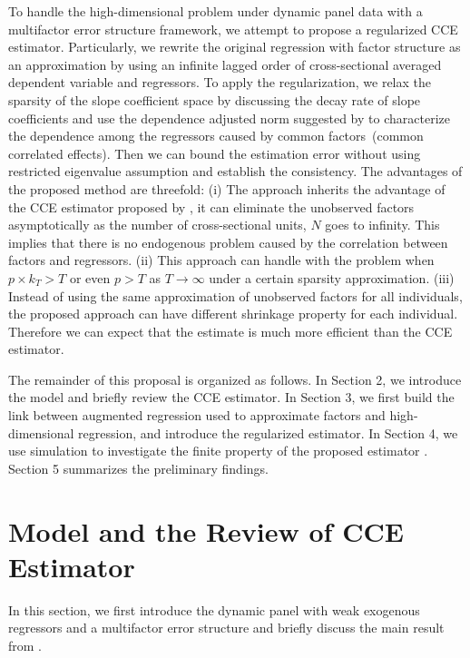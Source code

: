 \documentclass[11pt,a4paper]{article}
\theoremstyle{definition}
\begin{document}
To handle the high-dimensional problem under dynamic panel data with a multifactor error structure framework, we attempt to propose a regularized CCE estimator. Particularly, we rewrite the original regression with factor structure as an approximation by using an infinite lagged order of cross-sectional averaged dependent variable and regressors. To apply the regularization, we relax the sparsity of the slope coefficient space by discussing the decay rate of slope coefficients and use the dependence adjusted norm suggested by \citet{Han2020} to characterize the dependence among the regressors caused by common factors~(common correlated effects).  Then we can bound the estimation error without using restricted eigenvalue assumption and establish the consistency. The advantages of the proposed method are threefold: (i) The  approach inherits the advantage of the CCE estimator proposed by \citet{Chudik2015}, it can eliminate the unobserved factors asymptotically as the number of cross-sectional units, $N$ goes to infinity. This implies that there is no endogenous problem caused by the correlation between factors and regressors. (ii) This approach can handle with the problem when  $p\times k_T>T$ or even $p>T$ as $T\rightarrow\infty$ under a certain sparsity approximation. (iii) Instead of using the same approximation of unobserved factors  for all individuals, the proposed approach can have different shrinkage property for each individual. Therefore we can expect that the estimate is much more efficient than the CCE estimator.

The remainder of this proposal is organized as follows. In Section 2, we introduce the model and briefly review the CCE estimator. In Section 3, we first build the link between augmented regression used to approximate factors and high-dimensional regression, and introduce the regularized estimator. In Section 4, we use simulation to investigate the finite property of the proposed estimator . Section 5 summarizes 
the preliminary findings.


\section{Model and the Review of CCE Estimator}\label{Sec:model}
In this section, we first introduce the dynamic panel with weak exogenous regressors and a multifactor error structure and briefly discuss the main result from \citet{Chudik2015}.
\end{document}
